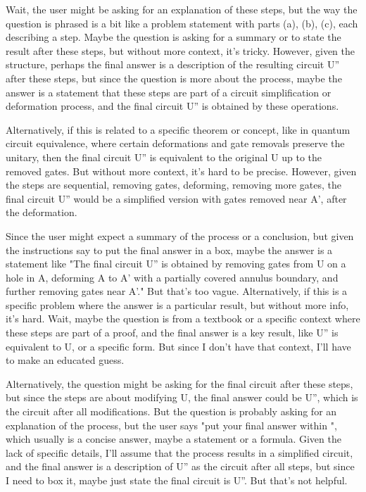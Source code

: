 Wait, the user might be asking for an explanation of these steps, but the way the question is phrased is a bit like a problem statement with parts (a), (b), (c), each describing a step. Maybe the question is asking for a summary or to state the result after these steps, but without more context, it's tricky. However, given the structure, perhaps the final answer is a description of the resulting circuit U'' after these steps, but since the question is more about the process, maybe the answer is a statement that these steps are part of a circuit simplification or deformation process, and the final circuit U'' is obtained by these operations. 

Alternatively, if this is related to a specific theorem or concept, like in quantum circuit equivalence, where certain deformations and gate removals preserve the unitary, then the final circuit U'' is equivalent to the original U up to the removed gates. But without more context, it's hard to be precise. However, given the steps are sequential, removing gates, deforming, removing more gates, the final circuit U'' would be a simplified version with gates removed near A', after the deformation. 

Since the user might expect a summary of the process or a conclusion, but given the instructions say to put the final answer in a box, maybe the answer is a statement like "The final circuit U'' is obtained by removing gates from U on a hole in A, deforming A to A' with a partially covered annulus boundary, and further removing gates near A'." But that's too vague. Alternatively, if this is a specific problem where the answer is a particular result, but without more info, it's hard. Wait, maybe the question is from a textbook or a specific context where these steps are part of a proof, and the final answer is a key result, like U'' is equivalent to U, or a specific form. But since I don't have that context, I'll have to make an educated guess. 

Alternatively, the question might be asking for the final circuit after these steps, but since the steps are about modifying U, the final answer could be U'', which is the circuit after all modifications. But the question is probably asking for an explanation of the process, but the user says "put your final answer within \boxed{}", which usually is a concise answer, maybe a statement or a formula. Given the lack of specific details, I'll assume that the process results in a simplified circuit, and the final answer is a description of U'' as the circuit after all steps, but since I need to box it, maybe just state the final circuit is U''. But that's not helpful. 

